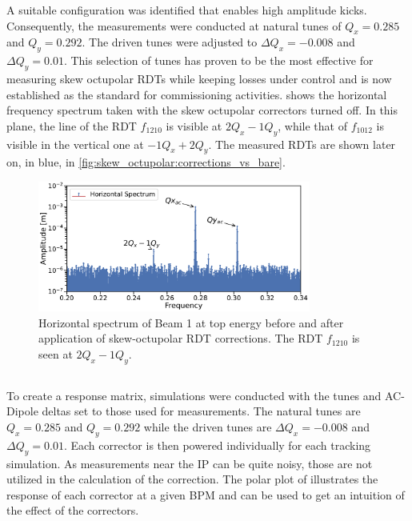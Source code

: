 A suitable configuration was identified that enables high amplitude kicks. Consequently, the
measurements were conducted at natural tunes of $Q_x = 0.285$ and $Q_y = 0.292$. The driven
tunes were adjusted to $\Delta Q_x = -0.008$ and $\Delta Q_y = 0.01$. This selection of tunes has
proven to be the most effective for measuring skew octupolar RDTs while keeping losses under control
and is now established as the standard for commissioning activities.
 shows the horizontal frequency spectrum taken
with the skew octupolar correctors turned off. In this plane, the line of the RDT $f_{1210}$ is
visible at $2Q_x - 1Q_y$, while that of $f_{1012}$ is visible in the vertical one at $-1Q_x + 2Q_y$.
The measured RDTs are shown later on, in blue, in \cref{fig:skew_octupolar:corrections_vs_bare}.

\begin{figure}[!htb]
    \centering
    \includegraphics[width=0.8\textwidth]{./images/spectrum_a4_top_energy.pdf}
    \caption{Horizontal spectrum of Beam 1 at top energy before and after application of
    skew-octupolar RDT corrections. The RDT $f_{1210}$ is seen at $2Q_x - 1Q_y$.}
    \label{fig:skew_octupolar:spectrum_a4_top_energy}
\end{figure}




\subsection{}

To create a response matrix, simulations were conducted with the tunes and AC-Dipole deltas set to
those used for measurements. The natural tunes are $Q_x = 0.285$ and $Q_y = 0.292$ while the driven
tunes are $\Delta Q_x = -0.008$ and $\Delta Q_y = 0.01$. Each corrector is then powered individually
for each tracking simulation. As measurements near the IP can be quite noisy, those are not utilized
in the calculation of the correction. The polar plot of
 illustrates the response of each corrector at a
given BPM and can be used to get an intuition of the effect of the correctors.

